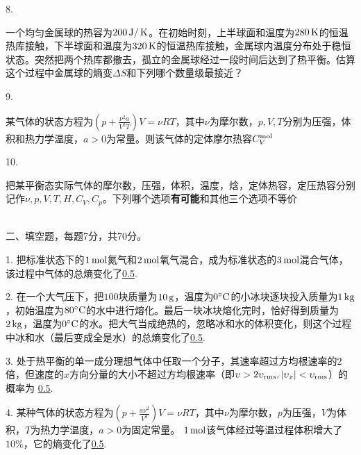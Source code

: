 \documentclass[12pt,CJK]{article}
\begin{document}
\item[8.]{一个均匀金属球的热容为$200\,\mathrm{J}/\,\mathrm{K}$。在初始时刻，上半球面和温度为$280\,\mathrm{K}$的恒温热库接触，下半球面和温度为$320\,\mathrm{K}$的恒温热库接触，金属球内温度分布处于稳恒状态。突然把两个热库都撤去，孤立的金属球经过一段时间后达到了热平衡。估算这个过程中金属球的熵变$\Delta S$和下列哪个数量级最接近？ \bropt

}


\item[9.]{某气体的状态方程为$\left(p+\frac{\nu^2 a}{V^2T}\right)V = \nu R T$，其中$\nu$为摩尔数，$p, V, T$分别为压强，体积和热力学温度，$a>0$为常量。则该气体的定体摩尔热容$C_V^{\rm mol}$ \bropt
  
}


\item[10.]{把某平衡态实际气体的摩尔数，压强，体积，温度，焓，定体热容，定压热容分别记作$\nu, p, V, T, H,C_V, C_p$。下列哪个选项{\bf 有可能}和其他三个选项不等价 \bropt
  
}


    

\eitem


{\vskip 0.5in}

\ \\
二、填空题，每题7分，共70分。

{\vskip 0.05in}


\bitem
\item[1.]{把标准状态下的$1\,\mathrm{mol}$氮气和$2\,\mathrm{mol}$氧气混合，成为标准状态的$3\,\mathrm{mol}$混合气体，该过程中气体的总熵变化了\uline{0.5}.}
  
\item[2.]{ 在一个大气压下，把$100$块质量为$10\,\mathrm{g}$，温度为$0^\circ \mathrm{C}$的小冰块逐块投入质量为$1\,\mathrm{kg}$，初始温度为$80^\circ \mathrm{C}$的水中进行熔化。最后一块冰块熔化完时，恰好得到质量为$2\,\mathrm{kg}$，温度为$0^\circ \mathrm{C}$的水。把大气当成绝热的，忽略冰和水的体积变化，则这个过程中冰和水（最后变成全是水）的总熵变化了\uline{0.5}.}
  
\item[3.]{ 处于热平衡的单一成分理想气体中任取一个分子，其速率超过方均根速率的$2$倍，但速度的$x$方向分量的大小不超过方均根速率（即$\upsilon>2\upsilon_{\rm rms}, |\upsilon_x|<\upsilon_{\rm rms}$）的概率为 \uline{0.5}.}

\item[4.]{某种气体的状态方程为$\left(p+\frac{a\nu^2}{V^3}\right)V = \nu R T$，其中$\nu$为摩尔数，$p$为压强，$V$为体积，$T$为热力学温度，$a>0$为固定常量。 $1\,\mathrm{mol}$该气体经过等温过程体积增大了$10\%$，它的熵变化了\uline{0.5}.}  
  
\end{document}
